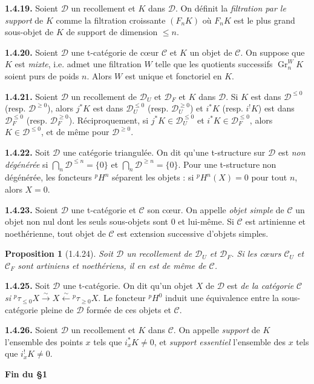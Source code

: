 \documentclass[12pt,a4paper]{article}
\theoremstyle{plain}
\newtheorem{proposition}[theorem]{Proposition}
\theoremstyle{definition}
\theoremstyle{remark}
\DeclareMathOperator{\Gr}{Gr}
\newcommand{\cC}{\mathcal{C}}
\newcommand{\cD}{\mathcal{D}}
\begin{document}
\smallskip

\noindent
\textbf{1.4.19.} Soient $\cD$ un recollement et $K$ dans $\cD$. On définit la \emph{filtration par le support} de $K$ comme la filtration croissante $(F_{n}K)$ où $F_{n}K$ est le plus grand sous-objet de $K$ de support de dimension $\leq n$.

\smallskip

\noindent
\textbf{1.4.20.} Soient $\cD$ une t-catégorie de cœur $\cC$ et $K$ un objet de $\cC$. On suppose que $K$ est \emph{mixte}, i.e. admet une filtration $W$ telle que les quotients successifs $\Gr_{n}^{W}K$ soient purs de poids $n$. Alors $W$ est unique et fonctoriel en $K$.

\smallskip

\noindent
\textbf{1.4.21.} Soient $\cD$ un recollement de $\cD_{U}$ et $\cD_{F}$ et $K$ dans $\cD$. Si $K$ est dans $\cD^{\leq 0}$ (resp. $\cD^{\geq 0}$), alors $j^{*}K$ est dans $\cD_{U}^{\leq 0}$ (resp. $\cD_{U}^{\geq 0}$) et $i^{*}K$ (resp. $i^{!}K$) est dans $\cD_{F}^{\leq 0}$ (resp. $\cD_{F}^{\geq 0}$). Réciproquement, si $j^{*}K \in \cD_{U}^{\leq 0}$ et $i^{*}K \in \cD_{F}^{\leq 0}$, alors $K \in \cD^{\leq 0}$, et de même pour $\cD^{\geq 0}$.

\smallskip

\noindent
\textbf{1.4.22.} Soit $\cD$ une catégorie triangulée. On dit qu'une t-structure sur $\cD$ est \emph{non dégénérée} si $\bigcap_{n} \cD^{\leq n} = \{0\}$ et $\bigcap_{n} \cD^{\geq n} = \{0\}$. Pour une t-structure non dégénérée, les foncteurs ${}^{p}H^{n}$ séparent les objets : si ${}^{p}H^{n}(X) = 0$ pour tout $n$, alors $X = 0$.

\smallskip

\noindent
\textbf{1.4.23.} Soient $\cD$ une t-catégorie et $\cC$ son cœur. On appelle \emph{objet simple} de $\cC$ un objet non nul dont les seuls sous-objets sont $0$ et lui-même. Si $\cC$ est artinienne et noethérienne, tout objet de $\cC$ est extension successive d'objets simples.

\smallskip

\begin{proposition}[1.4.24]
Soit $\cD$ un recollement de $\cD_{U}$ et $\cD_{F}$. Si les cœurs $\cC_{U}$ et $\cC_{F}$ sont artiniens et noethériens, il en est de même de $\cC$.
\end{proposition}

\smallskip

\noindent
\textbf{1.4.25.} Soit $\cD$ une t-catégorie. On dit qu'un objet $X$ de $\cD$ est \emph{de la catégorie} $\cC$ \emph{si} ${}^{p}\tau_{\leq 0}X \xrightarrow{\sim} X \xleftarrow{\sim} {}^{p}\tau_{\geq 0}X$. Le foncteur ${}^{p}H^{0}$ induit une équivalence entre la sous-catégorie pleine de $\cD$ formée de ces objets et $\cC$.

\smallskip

\noindent
\textbf{1.4.26.} Soient $\cD$ un recollement et $K$ dans $\cC$. On appelle \emph{support} de $K$ l'ensemble des points $x$ tels que $i_{x}^{*}K \neq 0$, et \emph{support essentiel} l'ensemble des $x$ tels que $i_{x}^{!}K \neq 0$.

\medskip

\noindent
\textbf{Fin du \S 1}
\end{document}
